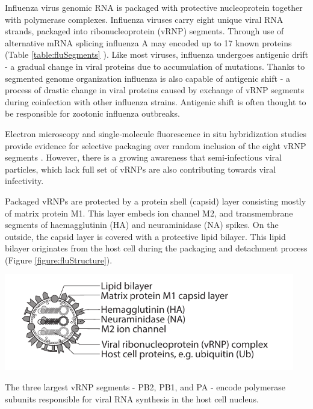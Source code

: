 Influenza virus genomic RNA is packaged with protective nucleoprotein together with polymerase complexes. Influenza viruses carry eight unique viral RNA strands, packaged into ribonucleoprotein  (vRNP) segments. Through use of alternative mRNA splicing influenza A may encoded up to 17 known proteins (Table \ref{table:fluSegments} \cite{das2010structures, dubois2014influenza}). Like most viruses, influenza undergoes antigenic drift - a gradual change in viral proteins due to accumulation of mutations. Thanks to segmented genome organization influenza is also capable of antigenic shift - a process of drastic change in viral proteins caused by exchange of vRNP segments during coinfection with other influenza strains. Antigenic shift is often thought to be responsible for zootonic influenza outbreaks.

Electron microscopy and single‑molecule fluorescence in situ hybridization studies provide evidence for selective packaging over random inclusion of the eight vRNP segments \cite{eisfeld2015centre}. However, there is a growing awareness that semi-infectious viral particles, which lack full set of vRNPs are also contributing towards viral infectivity.

Packaged vRNPs are protected by a protein shell (capsid) layer consisting mostly of matrix protein M1. This layer embeds ion channel M2, and transmembrane segments of haemagglutinin (HA) and neuraminidase (NA) spikes. On the outside, the capsid layer is covered with a protective lipid bilayer. This lipid bilayer originates from the host cell during the packaging and detachment process (Figure \ref{figure:fluStructure}).

\begin{center}
\includegraphics[width=0.95\textwidth, trim={0cm 0cm 0cm 0cm}, clip]{D_chapters/0_introduction/flu_structure.pdf}
\label{figure:fluStructure}
\end{center}

The three largest vRNP segments - PB2, PB1, and PA - encode polymerase subunits responsible for viral RNA synthesis in the host cell nucleus.

